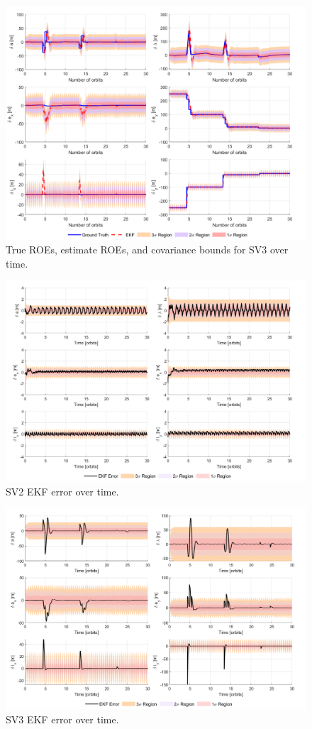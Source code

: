 \begin{figure}[H]
    \centering
    \includegraphics[width=0.7\linewidth]{sim/figures/PS9/ROE_over_time_SV3_comparison.png}
    \caption{True ROEs, estimate ROEs, and covariance bounds for SV3 over time.}
    \label{fig:sv3_ekf_comparison_ps9}
\end{figure}

\begin{figure}[H]
    \centering
    \includegraphics[width=0.7\linewidth]{sim/figures/PS9/EKF_error_SV2.png}
    \caption{SV2 EKF error over time.}
    \label{fig:ekf_error_ps9_sv2}
\end{figure}


\begin{figure}[H]
    \centering
    \includegraphics[width=0.7\linewidth]{sim/figures/PS9/EKF_error_SV3.png}
    \caption{SV3 EKF error over time.}
    \label{fig:ekf_error_ps9_sv3}
\end{figure}

